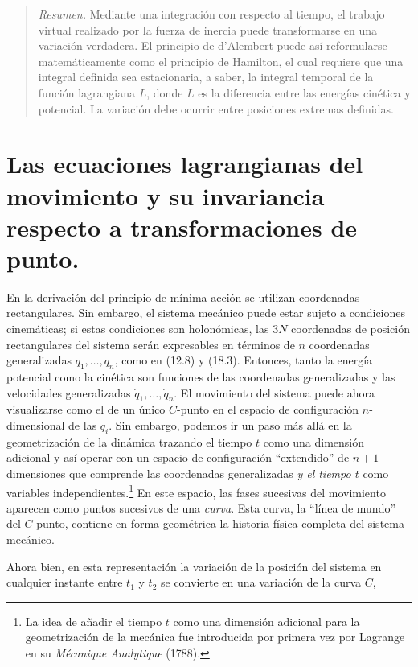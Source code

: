 \documentclass[12pt,a4paper]{book}
\begin{document}

\begin{quote}
\textit{Resumen.} Mediante una integración con respecto al tiempo, el trabajo virtual realizado por la fuerza de inercia puede transformarse en una variación verdadera. El principio de d'Alembert puede así reformularse matemáticamente como el principio de Hamilton, el cual requiere que una integral definida sea estacionaria, a saber, la integral temporal de la función lagrangiana $L$, donde $L$ es la diferencia entre las energías cinética y potencial. La variación debe ocurrir entre posiciones extremas definidas.
\end{quote}

\section{Las ecuaciones lagrangianas del movimiento y su invariancia respecto a transformaciones de punto.}

En la derivación del principio de mínima acción se utilizan coordenadas rectangulares. Sin embargo, el sistema mecánico puede estar sujeto a condiciones cinemáticas; si estas condiciones son holonómicas, las $3N$ coordenadas de posición rectangulares del sistema serán expresables en términos de $n$ coordenadas generalizadas $q_1, \ldots, q_n$, como en (12.8) y (18.3). Entonces, tanto la energía potencial como la cinética son funciones de las coordenadas generalizadas y las velocidades generalizadas $\dot{q}_1, \ldots, \dot{q}_n$. El movimiento del sistema puede ahora visualizarse como el de un único $C$-punto en el espacio de configuración $n$-dimensional de las $q_i$. Sin embargo, podemos ir un paso más allá en la geometrización de la dinámica trazando el tiempo $t$ como una dimensión adicional y así operar con un espacio de configuración ``extendido'' de $n + 1$ dimensiones que comprende las coordenadas generalizadas \textit{y el tiempo $t$} como variables independientes.\footnote{La idea de añadir el tiempo $t$ como una dimensión adicional para la geometrización de la mecánica fue introducida por primera vez por Lagrange en su \textit{Mécanique Analytique} (1788).} En este espacio, las fases sucesivas del movimiento aparecen como puntos sucesivos de una \textit{curva}. Esta curva, la ``línea de mundo'' del $C$-punto, contiene en forma geométrica la historia física completa del sistema mecánico.

Ahora bien, en esta representación la variación de la posición del sistema en cualquier instante entre $t_1$ y $t_2$ se convierte en una variación de la curva $C$,
\end{document}
